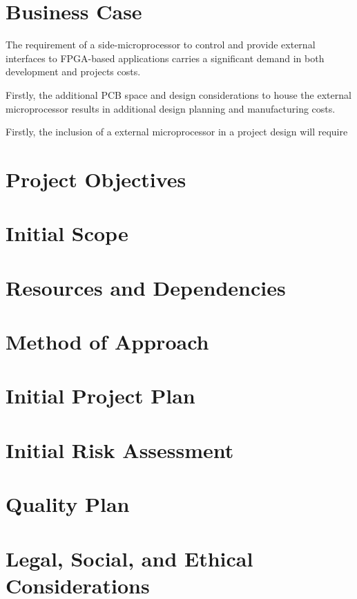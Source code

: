 \documentclass[11pt,a4paper]{article}
\begin{document}
\section{Business Case}
The requirement of a side-microprocessor to control and provide external interfaces to FPGA-based applications carries a significant demand in both development and projects costs. 

Firstly, the additional PCB space and design considerations to house the external microprocessor results in additional design planning and manufacturing costs. 

Firstly, the inclusion of a external microprocessor in a project design will require 


\section{Project Objectives}

\section{Initial Scope}

\section{Resources and Dependencies}

\section{Method of Approach}

\section{Initial Project Plan}

\section{Initial Risk Assessment}

\section{Quality Plan}

\section{Legal, Social, and Ethical Considerations}

\citep{null}
\newpage

 
\end{document}
